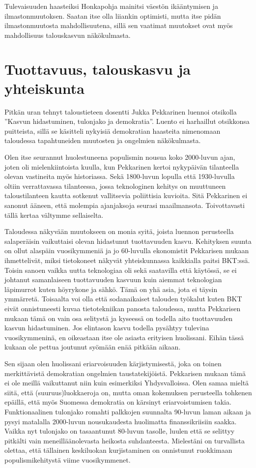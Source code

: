 \documentclass[12pt]{article}
\begin{document}
Tulevaisuuden haasteiksi Honkapohja mainitsi väestön ikääntymisen ja ilmastonmuutoksen. Saatan itse olla liiankin optimisti, mutta itse pidän ilmastonmuutosta mahdollisuutena, sillä sen vaatimat muutokset ovat myös mahdollisuus talouskasvun näkökulmasta.


\newpage
\section{Tuottavuus, talouskasvu ja yhteiskunta}

Pitkän uran tehnyt taloustieteen dosentti Jukka Pekkarinen luennoi otsikolla ''Kasvun hidastuminen, tulonjako ja demokratia''. Luento ei harhaillut otsikkonsa puitteista, sillä se käsitteli nykyisiä demokratian haasteita nimenomaan taloudessa tapahtuneiden muutosten ja ongelmien näkökulmasta.

Olen itse seurannut huolestuneena populismin nousua koko 2000-luvun ajan, joten oli mielenkiintoista kuulla, kun Pekkarinen kertoi nykypäivän tilanteella olevan vastineita myös historiassa. Sekä 1800-luvun lopulla että 1930-luvulla oltiin verrattavassa tilanteessa, jossa teknologinen kehitys on muuttuneen taloustilanteen kautta sotkenut vallitsevia poliittisia kuvioita. Sitä Pekkarinen ei sanonut ääneen, että molempia ajanjaksoja seurasi maailmansota. Toivottavasti tällä kertaa vältymme sellaiselta.

Taloudessa näkyvään muutokseen on monia syitä, joista luennon perusteella salaperäisin vaikuttaisi olevan hidastunut tuottavuuden kasvu. Kehityksen suunta on ollut alaspäin vuosikymmeniä ja jo 60-luvulla ekonomistit Pekkarisen mukaan ihmettelivät, miksi tietokoneet näkyvät yhteiskunnassa kaikkialla paitsi BKT:ssä. Toisin sanoen vaikka uutta teknologiaa oli sekä saatavilla että käytössä, se ei johtanut samanlaiseen tuottavuuden kasvuun kuin aiemmat teknologian läpimurrot kuten höyrykone ja sähkö. Tämä on yhä asia, jota ei täysin ymmärretä. Toisaalta voi olla että sodanaikaiset talouden työkalut kuten BKT eivät onnistuneesti kuvaa tietotekniikan panosta taloudessa, mutta Pekkarisen mukaan tämä on vain osa selitystä ja kyseessä on todella aito tuottavuuden kasvun hidastuminen. Jos elintason kasvu todella pysähtyy tulevina vuosikymmeninä, en oikeastaan itse ole asiasta erityisen huolissani. Eihän tässä kukaan ole pettua joutunut syömään enää pitkään aikaan.

Sen sijaan olen huolissani eriarvoisuuden kärjistymisestä, joka on toinen merkittävistä demokratian ongelmien taustatekijöistä. Pekkarisen mukaan tämä ei ole meillä vaikuttanut niin kuin esimerkiksi Yhdysvalloissa. Olen samaa mieltä siitä, että (suuruus)luokkaeroja on, mutta oman kokemuksen perusteella tohkenen epäillä, että myös Suomessa demokratia on kärsinyt eriarvoistumisen takia. Funktionaalinen tulonjako romahti palkkojen suunnalta 90-luvun laman aikaan ja pysyi matalalla 2000-luvun nousukaudesta huolimatta finanssikriisiin saakka. Vaikka nyt tulonjako on tasaantunut 80-luvun tasolle, luulen että se selittyy pitkälti vain meneilläänolevasta heikosta suhdanteesta. Mielestäni on turvallista olettaa, että tällainen keskiluokan kurjistaminen on onnistunut ruokkimaan populismikehitystä viime vuosikymmenet.
\end{document}
